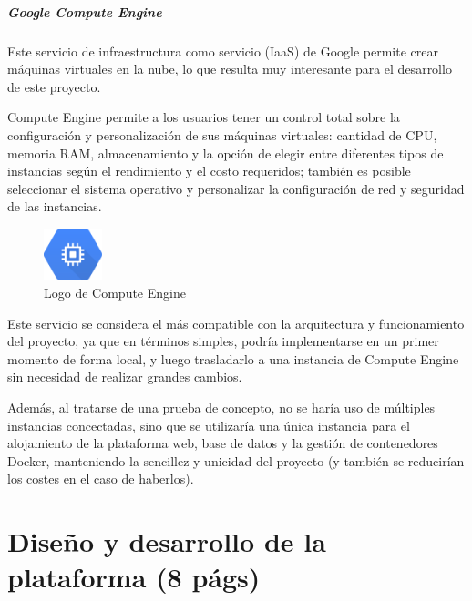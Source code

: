                 \paragraph{Google Compute Engine}

                    Este servicio de infraestructura como servicio (IaaS) de Google permite crear máquinas virtuales en la nube, lo que resulta muy interesante para el desarrollo de este proyecto.

                    Compute Engine permite a los usuarios tener un control total sobre la configuración y personalización de sus máquinas virtuales: cantidad de CPU, memoria RAM, almacenamiento y la opción de elegir entre diferentes tipos de instancias según el rendimiento y el costo requeridos; también es posible seleccionar el sistema operativo y personalizar la configuración de red y seguridad de las instancias.

                    \begin{figure}[htbp]
                        \centering

                        \includegraphics[width=0.15\textwidth]{images/Logos/gce.png}
                        \caption{Logo de Compute Engine}
                        
                        \label{fig:gce-logo}
                    \end{figure}

                    Este servicio se considera el más compatible con la arquitectura y funcionamiento del proyecto, ya que en términos simples, podría implementarse en un primer momento de forma local, y luego trasladarlo a una instancia de Compute Engine sin necesidad de realizar grandes cambios.

                    Además, al tratarse de una prueba de concepto, no se haría uso de múltiples instancias concectadas, sino que se utilizaría una única instancia para el alojamiento de la plataforma web, base de datos y la gestión de contenedores Docker, manteniendo la sencillez y unicidad del proyecto (y también se reducirían los costes en el caso de haberlos).

                    \cleardoublepage



\chapter{Diseño y desarrollo de la plataforma (8 págs)}
    

